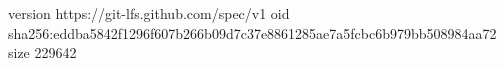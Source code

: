 version https://git-lfs.github.com/spec/v1
oid sha256:eddba5842f1296f607b266b09d7c37e8861285ae7a5fcbc6b979bb508984aa72
size 229642
